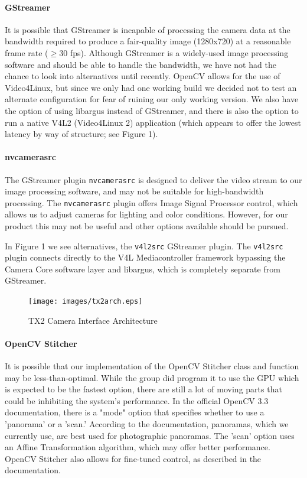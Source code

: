 \documentclass[letterpaper,10pt,serif,draftclsnofoot,onecolumn,compsoc,titlepage]{IEEEtran}
\begin{document}
\paragraph*{GStreamer} It is possible that GStreamer is incapable of processing the camera 
data at the bandwidth required to produce a fair-quality image (1280x720) at a reasonable 
frame rate ($\ge$30 fps). Although GStreamer is a widely-used image processing software 
and should be able to handle the bandwidth, we have not had the chance to look into 
alternatives until recently. OpenCV allows for the use of Video4Linux, but since we only 
had one working build we decided not to test an alternate configuration for fear of 
ruining our only working version. We also have the option of using libargus instead of 
GStreamer, and there is also the option to run a native V4L2 (Video4Linux 2) application 
(which appears to offer the lowest latency by way of structure; see Figure 1).

\paragraph*{nvcamerasrc} The GStreamer plugin \texttt{nvcamerasrc} is designed to deliver 
the video stream to our image processing software, and may not be suitable for 
high-bandwidth processing. The \texttt{nvcamerasrc} plugin offers Image Signal Processor 
control, which allows us to adjust cameras for lighting and color conditions. 
However, for our product this may not be useful and other options available should be 
pursued. 

In Figure 1 we see alternatives, the \texttt{v4l2src} GStreamer plugin. The 
\texttt{v4l2src} plugin connects directly to the V4L Mediacontroller framework bypassing 
the Camera Core software layer and libargus, which is completely separate from GStreamer.

\begin{figure}[H]
  	\centering
	\label{fig:tx2arch}
	\texttt{[image: images/tx2arch.eps]}
	\caption{TX2 Camera Interface Architecture \label{overflow}}
\end{figure}

\paragraph*{OpenCV Stitcher} It is possible that our implementation of the OpenCV Stitcher 
class and function may be less-than-optimal. While the group did program it to use the GPU 
which is expected to be the fastest option, there are still a lot of moving parts that 
could be inhibiting the system's performance. In the official OpenCV 3.3 documentation, 
there is a "mode" option that specifies whether to use a 'panorama' or a 'scan.' According 
to the documentation, panoramas, which we currently 
use, are best used for photographic panoramas. The 'scan' option uses an Affine 
Transformation algorithm, which may offer better performance. OpenCV Stitcher also allows 
for fine-tuned control, as described in the documentation.
\end{document}
